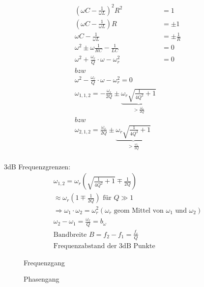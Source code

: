 \begin{align}
	\left(\omega C-\frac{1}{\omega L}\right)^2R^2 &= 1\nonumber\\
	\left(\omega C - \frac{1}{\omega L}\right)R &= \pm 1\nonumber\\
	\omega C - \frac{1}{\omega L} &= \pm \frac{1}{R}\nonumber\\
	\omega^2 \pm \omega \frac{1}{RC}-\frac{1}{LC} &= 0\nonumber\\
	\omega^2 + \frac{\omega_r}{Q}\cdot \omega - \omega_r^2&=0 \\ bzw\\ \omega^2 -
	\frac{\omega_r}{Q}\cdot \omega - \omega_r^2=0\nonumber\\
	\omega_{1,1,2} = -\frac{\omega_r}{2Q} \pm 
	\underbrace{\omega_r\sqrt{\frac{1}{4Q^2}+1}}_{>\frac{\omega_r}{2Q}}
	\\	bzw \\
	\omega_{2,1,2}=\frac{\omega_r}{2Q} \pm
	\underbrace{\omega_r\sqrt{\frac{1}{4Q^2}+1}}_{>\frac{\omega_r}{2Q}} \nonumber\\
\end{align}


3dB Frequenzgrenzen:\\
\begin{align}
	\boxed{\omega_{1,2}=\omega_r\left(\sqrt{\frac{1}{4Q^2}+1}\mp\frac{1}{2Q}\right)}\\
	\approx \omega_r\left(1\mp\frac{1}{2Q}\right) \text{ für } Q \gg 1\nonumber\\
	\Rightarrow \omega_1\cdot\omega_2=\omega_r^2 (\omega_r \text{ geom Mittel von
		} \omega_1 \text{ und } \omega_2)\nonumber\\
	\omega_2 - \omega_1 = \frac{\omega_r}{Q} = b_{\omega}\nonumber\\
	\boxed{\text{Bandbreite } B = f_2 - f_1 = \frac{f_r}{Q}}\\
	\text{Frequenzabstand der 3dB Punkte}\nonumber
\end{align}

\begin{figure}[!h]
	\centering
	
	\caption{Frequenzgang}
	\label{fig:ParallelImpedanzBetrag}
\end{figure}
\begin{figure}[!h]
	\centering
	
	\caption{Phasengang}
	\label{fig:ParallelImpedanzPhase}
\end{figure}

